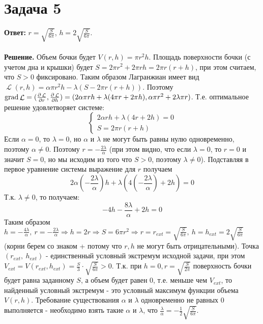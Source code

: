 \documentclass{article}
\DeclareMathOperator{\grad}{grad}
\DeclareMathOperator{\lagr}{\mathcal{L}}
\begin{document}
 \section*{Задача 5}
 {\bf Ответ: } $r = \sqrt{\frac{S}{6\pi}}$, $h=2\sqrt{\frac{S}{6\pi}}$.
 \\
 \\
 {\bf Решение.} Объем бочки будет $V(r,h)=\pi r^2 h$. Площадь поверхности бочки (с учетом дна и крышки) будет $S=2\pi r^2+2\pi r h = 2\pi r (r+h)$, при этом считаем, что $S > 0$ фиксировано. Таким образом Лагранжиан имеет вид $\lagr(r,h) = \alpha \pi r^2 h - \lambda(S-2\pi r (r + h))$. Поэтому $\grad \lagr=(\pdv{\lagr}{r}, \pdv{\lagr}{h})=(2\alpha\pi r h + \lambda(4\pi r + 2\pi h), \alpha\pi r^2+2\lambda\pi r)$. Т.е. оптимальное решение удовлетворяет системе:
 \begin{equation*}
 \begin{cases}
   2\alpha rh + \lambda (4r + 2h)=0\\
   S = 2\pi r (r+h)
 \end{cases}
\end{equation*}
Если $\alpha=0$, то $\lambda=0$, но $\alpha$ и $\lambda$ не могут быть равны нулю одновременно, поэтому $\alpha \neq 0$. Поэтому $r=-\frac{2\lambda}{\alpha}$ (при этом видно, что если $\lambda=0$, то $r=0$ и значит $S=0$, но мы исходим из того что $S>0$, поэтому $\lambda\neq 0$). Подставляя в первое уравнение системы выражение для $r$ получаем 
$$2\alpha\left(-\frac{2\lambda}{\alpha}\right)h+\lambda\left(4\left(-\frac{2\lambda}{\alpha}\right) + 2h\right)=0$$
Т.к. $\lambda\neq 0$, то получаем:
$$-4h-\frac{8\lambda}{\alpha}+2h=0$$
Таким образом $h=-\frac{4\lambda}{\alpha},\ r=-\frac{2\lambda}{\alpha}\Rightarrow h=2r \Rightarrow S = 6\pi r^2\Rightarrow r = r_{ext} = \sqrt{\frac{S}{6\pi}},\ h=h_{ext}=2\sqrt{\frac{S}{6\pi}}$ (корни берем со знаком + потому что $r,h$ не могут быть отрицательными). Точка $(r_{ext},\ h_{ext})$ -  единственный условный экстремум исходной задачи, при этом $V_{ext}=V(r_{ext}, h_{ext}) = \frac{S}{3}\cdot\sqrt{\frac{S}{6\pi}} > 0$. Т.к. при $h=0, r=\sqrt{\frac{S}{2\pi}}$ поверхность бочки будет равна заданному $S$, а объем будет равен $0$, т.е. меньше чем $V_{ext}$, то найденный условный экстремум - это условный максимум функции объема $V(r,h)$. Требование существования $\alpha$ и $\lambda$ одновременно не равных 0 выполняется - необходимо взять такие $\alpha$ и $\lambda$, что $\frac{\lambda}{\alpha}=-\frac{1}{2}\sqrt{\frac{S}{6\pi}}$.
\end{document}
